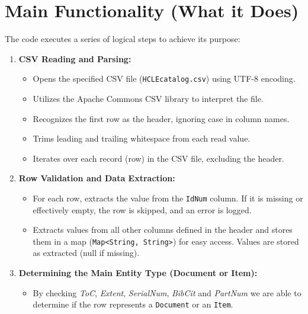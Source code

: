 \documentclass[11pt, a4paper]{article}
\begin{document}
\section{Main Functionality (What it Does)}
The code executes a series of logical steps to achieve its purpose:

\begin{enumerate}
    \item \textbf{CSV Reading and Parsing:}
        \begin{itemize}
            \item Opens the specified CSV file (\texttt{HCLEcatalog.csv}) using UTF-8 encoding.
            \item Utilizes the Apache Commons CSV library to interpret the file.
            \item Recognizes the first row as the header, ignoring case in column names.
            \item Trims leading and trailing whitespace from each read value.
            \item Iterates over each record (row) in the CSV file, excluding the header.
        \end{itemize}

    \item \textbf{Row Validation and Data Extraction:}
        \begin{itemize}
            \item For each row, extracts the value from the \texttt{IdNum} column. If it is missing or effectively empty, the row is skipped, and an error is logged.
            \item Extracts values from all other columns defined in the header and stores them in a map (\texttt{Map<String, String>}) for easy access. Values are stored as extracted (null if missing).
        \end{itemize}

    \item \textbf{Determining the Main Entity Type (Document or Item):}
        \begin{itemize}
            \item By checking \textit{ToC}, \textit{Extent}, \textit{SerialNum}, \textit{BibCit} and \textit{PartNum} we are able to determine if the row represents a \texttt{Document} or an \texttt{Item}. 
        \end{itemize}


\end{enumerate}
\end{document}
